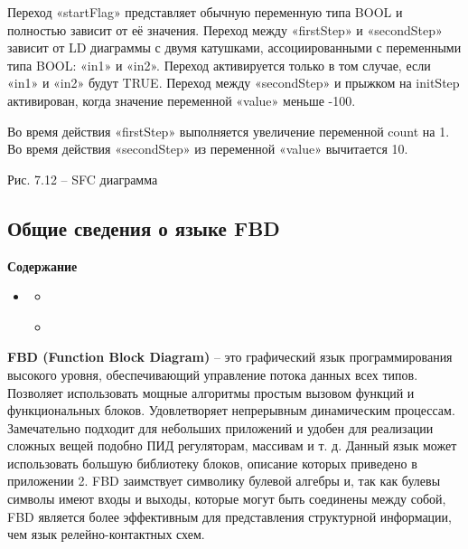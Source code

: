 \documentclass[letterpaper,10pt,russian]{sphinxmanual}
\begin{document}
Переход «startFlag» представляет обычную переменную типа BOOL и
полностью зависит от её значения. Переход между «firstStep» и
«secondStep» зависит от LD диаграммы с двумя катушками, ассоциированными
с переменными типа BOOL: «in1» и «in2». Переход активируется только в
том случае, если «in1» и «in2» будут TRUE. Переход между «secondStep» и
прыжком на initStep активирован, когда значение переменной «value»
меньше -100.

Во время действия «firstStep» выполняется увеличение переменной count на
1. Во время действия «secondStep» из переменной «value» вычитается 10.


Рис. 7.12 – SFC диаграмма


\subsection{Общие сведения о языке FBD}
\label{iec_guide/fbd_guide::doc}\label{iec_guide/fbd_guide:fbd}
\begin{sphinxShadowBox}
\textbf{Содержание}

\medskip

\begin{itemize}
\item {} 
\label{iec_guide/fbd_guide:id4}{\hyperref[iec_guide/fbd_guide:fbd]{}}
\begin{itemize}
\item {} 
\label{iec_guide/fbd_guide:id5}{\hyperref[iec_guide/fbd_guide:id2]{}}

\item {} 
\label{iec_guide/fbd_guide:id6}{\hyperref[iec_guide/fbd_guide:id3]{}}

\end{itemize}

\end{itemize}
\end{sphinxShadowBox}

\textbf{FBD (Function Block Diagram)} – это графический язык программирования
высокого уровня, обеспечивающий управление потока данных всех типов.
Позволяет использовать мощные алгоритмы простым вызовом функций и
функциональных блоков. Удовлетворяет непрерывным динамическим процессам.
Замечательно подходит для небольших приложений и удобен для реализации
сложных вещей подобно ПИД регуляторам, массивам и т. д. Данный язык
может использовать большую библиотеку блоков, описание которых приведено
в приложении 2. FBD заимствует символику булевой алгебры и, так как
булевы символы имеют входы и выходы, которые могут быть соединены между
собой, FBD является более эффективным для представления структурной
информации, чем язык релейно-контактных схем.
\end{document}

